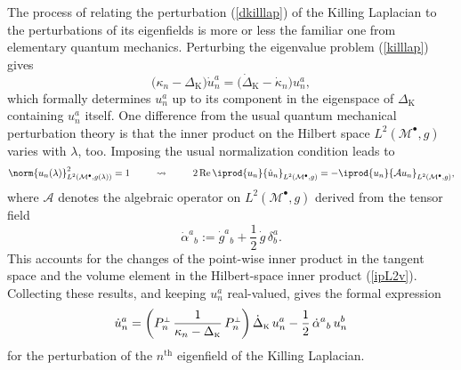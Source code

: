 \documentclass[12pt,letterpaper]{iopart}
\newcommand\Lap[1][K]{\Delta_{\scriptscriptstyle\mathrm{#1}}}
\newcommand\dLap[1][K]{\dot\Delta_{\scriptscriptstyle\mathrm{#1}}}
\newcommand\M{\mathcal{M}}
\newcommand\ind{{\bullet}}
\begin{document}
The process of relating the perturbation (\ref{dkilllap}) of the Killing Laplacian to the perturbations of its eigenfields is more or less the familiar one from elementary quantum mechanics.  Perturbing the eigenvalue problem (\ref{killlap}) gives 
%
\begin{equation}\label{deveq}
	\bigl( \kappa_n - \Lap \bigr) \dot u_n^a = \bigl( \dLap - \dot\kappa_n \bigr) u_n^a, 
\end{equation}
%
which formally determines $u_n^a$ up to its component in the eigenspace of $\Lap$ containing $u_n^a$ itself.  One difference from the usual quantum mechanical perturbation theory is that the inner product on the Hilbert space $L^2(\M^\ind, g)$ varies with $\lambda$, too.  Imposing the usual normalization condition leads to 
%
\begin{equation}
	\norm{u_n(\lambda)}^2_{L^2(\M^\ind, g(\lambda))} = 1
	\qquad\leadsto\qquad
	2 \real \iprod{u_n}{\dot u_n}_{L^2(\M^\ind, g)} = - \iprod{u_n}{\mathcal{A} u_n}_{L^2(\M^\ind, g)}, 
\end{equation}
%
where $\mathcal{A}$ denotes the algebraic operator on $L^2(\M^\ind, g)$ derived from the tensor field 
%
\begin{equation}\label{alphadot}
	\dot\alpha^a{}_b := \dot g^a{}_b + \frac{1}{2}\, \dot g\, \delta^a_b.
\end{equation}
%
This accounts for the changes of the point-wise inner product in the tangent space and the volume element in the Hilbert-space inner product (\ref{ipL2v}).  Collecting these results, and keeping $u_n^a$ real-valued, gives the formal expression 
%
\begin{equation}\label{dunform}
	\dot u_n^a = \biggl( P_n^\shortperp\, \frac{1}{\kappa_n - \Lap}\, P_n^\shortperp \biggr)\, \dLap\, u_n^a 
		- \frac{1}{2}\, \dot\alpha^a{}_b\, u_n^b
\end{equation}
%
for the perturbation of the $n^{\mathrm{th}}$ eigenfield of the Killing Laplacian.
\end{document}
